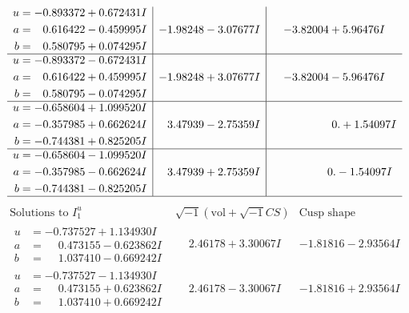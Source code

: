 \documentclass[1p]{elsarticle_modified}
\theoremstyle{definition}
\newcommand{\I}{\sqrt{-1}}
\begin{document}
$$\begin{array}{c|c|c}
\begin{aligned}
u &= -0.893372 + 0.672431 I \\
a &= \phantom{-}0.616422 - 0.459995 I \\
b &= \phantom{-}0.580795 + 0.074295 I\end{aligned}
 & -1.98248 - 3.07677 I & -3.82004 + 5.96476 I \\ \hline\begin{aligned}
u &= -0.893372 - 0.672431 I \\
a &= \phantom{-}0.616422 + 0.459995 I \\
b &= \phantom{-}0.580795 - 0.074295 I\end{aligned}
 & -1.98248 + 3.07677 I & -3.82004 - 5.96476 I \\ \hline\begin{aligned}
u &= -0.658604 + 1.099520 I \\
a &= -0.357985 + 0.662624 I \\
b &= -0.744381 + 0.825205 I\end{aligned}
 & \phantom{-}3.47939 - 2.75359 I & \phantom{-0.000000 -}0. + 1.54097 I \\ \hline\begin{aligned}
u &= -0.658604 - 1.099520 I \\
a &= -0.357985 - 0.662624 I \\
b &= -0.744381 - 0.825205 I\end{aligned}
 & \phantom{-}3.47939 + 2.75359 I & \phantom{-0.000000 } 0. - 1.54097 I\\
 \hline 
 \end{array}$$\newpage$$\begin{array}{c|c|c}  
\text{Solutions to }I^u_{1}& \I (\text{vol} + \sqrt{-1}CS) & \text{Cusp shape}\\
 \hline 
\begin{aligned}
u &= -0.737527 + 1.134930 I \\
a &= \phantom{-}0.473155 - 0.623862 I \\
b &= \phantom{-}1.037410 - 0.669242 I\end{aligned}
 & \phantom{-}2.46178 + 3.30067 I & -1.81816 - 2.93564 I \\ \hline\begin{aligned}
u &= -0.737527 - 1.134930 I \\
a &= \phantom{-}0.473155 + 0.623862 I \\
b &= \phantom{-}1.037410 + 0.669242 I\end{aligned}
 & \phantom{-}2.46178 - 3.30067 I & -1.81816 + 2.93564 I \\ \hline\begin{aligned}

\end{aligned}
\end{array}$$
\end{document}
